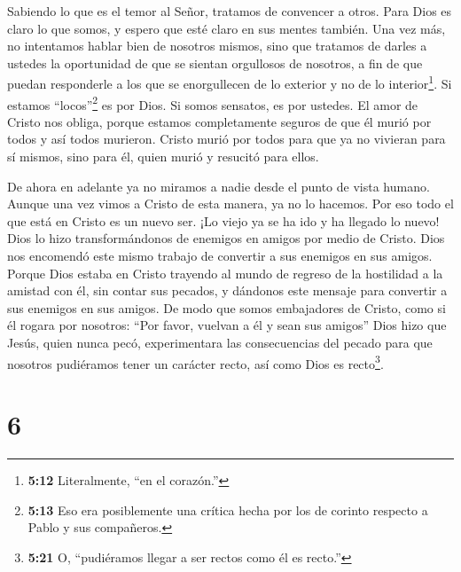  Sabiendo lo que es el temor al Señor, tratamos de
convencer a otros. Para Dios es claro lo que somos, y espero que esté
claro en sus mentes también.  Una vez más, no intentamos
hablar bien de nosotros mismos, sino que tratamos de darles a ustedes la
oportunidad de que se sientan orgullosos de nosotros, a fin de que
puedan responderle a los que se enorgullecen de lo exterior y no de lo
interior\footnote{\textbf{5:12} Literalmente, ``en el corazón.''}.
 Si estamos ``locos''\footnote{\textbf{5:13} Eso era
  posiblemente una crítica hecha por los de corinto respecto a Pablo y
  sus compañeros.} es por Dios. Si somos sensatos, es por ustedes.
 El amor de Cristo nos obliga, porque estamos completamente
seguros de que él murió por todos y así todos murieron. 
Cristo murió por todos para que ya no vivieran para sí mismos, sino para
él, quien murió y resucitó para ellos.

 De ahora en adelante ya no miramos a nadie desde el punto
de vista humano. Aunque una vez vimos a Cristo de esta manera, ya no lo
hacemos.  Por eso todo el que está en Cristo es un nuevo
ser. ¡Lo viejo ya se ha ido y ha llegado lo nuevo!  Dios lo
hizo transformándonos de enemigos en amigos por medio de Cristo. Dios
nos encomendó este mismo trabajo de convertir a sus enemigos en sus
amigos.  Porque Dios estaba en Cristo trayendo al mundo de
regreso de la hostilidad a la amistad con él, sin contar sus pecados, y
dándonos este mensaje para convertir a sus enemigos en sus amigos.
 De modo que somos embajadores de Cristo, como si él rogara
por nosotros: ``Por favor, vuelvan a él y sean sus amigos''
 Dios hizo que Jesús, quien nunca pecó, experimentara las
consecuencias del pecado para que nosotros pudiéramos tener un carácter
recto, así como Dios es recto\footnote{\textbf{5:21} O, ``pudiéramos
  llegar a ser rectos como él es recto.''}.

\hypertarget{section-5}{%
\section{6}\label{section-5}}


